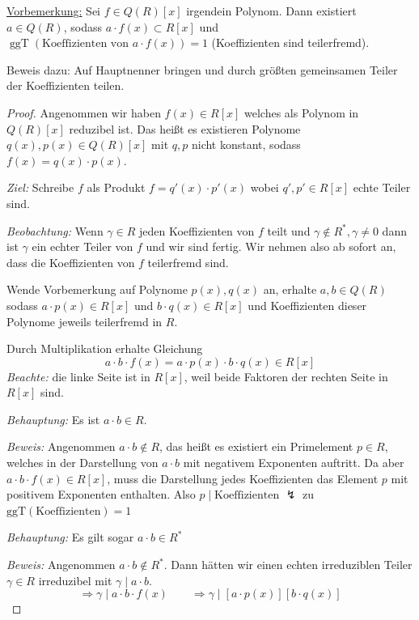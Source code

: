 \documentclass[a4paper,12pt,numbers=noenddot,parskip=full]{scrartcl}
\newcommand{\heading}{\underline}
\theoremstyle{dotless}
\theoremstyle{remark}
\begin{document}
	\heading{Vorbemerkung:} Sei $f \in Q(R)[x]$ irgendein Polynom. Dann existiert $a \in Q(R)$, sodass $a \cdot f(x) \subset R[x]$ und $\operatorname{ggT}(\text{Koeffizienten von } a \cdot f(x)) = 1$ (Koeffizienten sind teilerfremd).
	
	Beweis dazu: Auf Hauptnenner bringen und durch größten gemeinsamen Teiler der Koeffizienten teilen.
	
	\begin{proof}
		Angenommen wir haben $f(x) \in R[x]$ welches als Polynom in $Q(R)[x]$ reduzibel ist. Das heißt es existieren Polynome $q(x), p(x) \in Q(R)[x]$ mit $q,p$ nicht konstant, sodass $f(x) = q(x) \cdot p(x)$.
		
		\textit{Ziel:} Schreibe $f$ als Produkt $f = q'(x) \cdot p'(x)$ wobei $q',p' \in R[x]$ echte Teiler sind.
		
		\textit{Beobachtung:} Wenn $\gamma \in R$ jeden Koeffizienten von $f$ teilt und $\gamma \notin R^*, \gamma \neq 0$ dann ist $\gamma$ ein echter Teiler von $f$ und wir sind fertig. Wir nehmen also ab sofort an, dass die Koeffizienten von $f$ teilerfremd sind.
		
		Wende Vorbemerkung auf Polynome $p(x), q(x)$ an, erhalte $a,b \in Q(R)$ sodass $a \cdot p(x) \in R[x]$ und $b \cdot q(x) \in R[x]$ und Koeffizienten dieser Polynome jeweils teilerfremd in $R$.
		
		Durch Multiplikation erhalte Gleichung
		\begin{equation*}
			a \cdot b \cdot f(x) = a \cdot p(x) \cdot b \cdot q(x) \in R[x] \tag{$*$}
		\end{equation*}
		\textit{Beachte:} die linke Seite ist in $R[x]$, weil beide Faktoren der rechten Seite in $R[x]$ sind.
		
		\textit{Behauptung:} Es ist $a \cdot b \in R$.
		
		\textit{Beweis:} Angenommen $a \cdot b \notin R$, das heißt es existiert ein Primelement $p \in R$, welches in der Darstellung von $a \cdot b$ mit negativem Exponenten auftritt. Da aber $a \cdot b \cdot f(x) \in R[x]$, muss die Darstellung jedes Koeffizienten das Element $p$ mit positivem Exponenten enthalten. Also $p \mid \text{Koeffizienten}$ $\lightning$ zu $\operatorname{ggT(\text{Koeffizienten})} = 1$
		
		\textit{Behauptung:} Es gilt sogar $a \cdot b \in R^*$
		
		\textit{Beweis:} Angenommen $a \cdot b \notin R^*$. Dann hätten wir einen echten irreduziblen Teiler $\gamma \in R$ irreduzibel mit $\gamma \mid a \cdot b$.
		\begin{equation*}
			\Rightarrow \gamma \mid a \cdot b \cdot f(x) \qquad \Rightarrow \gamma \mid [a \cdot p(x)][b \cdot q(x)]
		\end{equation*}
		

\end{proof}
\end{document}

